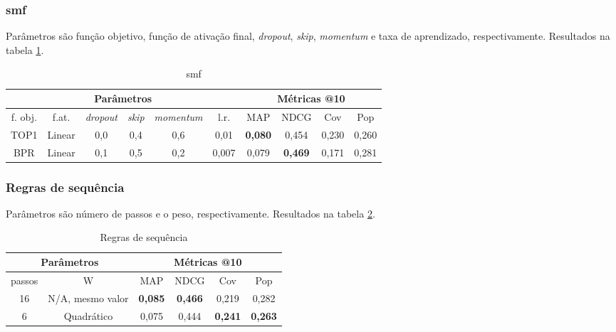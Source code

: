 \subsubsection{smf}
Parâmetros são função objetivo, função de ativação final, \textit{dropout},
\textit{skip}, \textit{momentum} e taxa de aprendizado, respectivamente.
Resultados na tabela \ref{opt:smf_rem}.

\begin{table}[htbp]
  \centering
  \begin{tabular}{|c|c|c|c|c|c|c|c|c|c|}
    \hline
      \multicolumn{6}{|c|}{Parâmetros} & \multicolumn{4}{c|}{Métricas @10} \\
      \hline
      f. obj. & f.at. & \textit{dropout} & \textit{skip} & \textit{momentum} & l.r. & MAP & NDCG & Cov & Pop \\
      \hline
      TOP1 & Linear & 0,0 & 0,4 & 0,6 & 0,01 & \textbf{0,080} & 0,454 & 0,230 & 0,260 \\
      \hline
      BPR & Linear & 0,1 & 0,5 & 0,2 & 0,007 & 0,079 & \textbf{0,469} & 0,171 & 0,281 \\
      \hline
      \end{tabular}
      \caption{smf}
      \label{opt:smf_rem}
\end{table}

\subsubsection{Regras de sequência}
Parâmetros são número de passos e o peso, respectivamente. Resultados na tabela
\ref{opt:sr_rem}.

\begin{table}[htbp]
  \centering
  \begin{tabular}{|c|c|c|c|c|c|}
    \hline
      \multicolumn{2}{|c|}{Parâmetros} & \multicolumn{4}{c|}{Métricas @10} \\
      \hline
      passos & W & MAP & NDCG & Cov & Pop \\
      \hline
      16 & N/A, mesmo valor & \textbf{0,085} & \textbf{0,466} & 0,219 & 0,282 \\
      \hline
      6 & Quadrático & 0,075 & 0,444 & \textbf{0,241} & \textbf{0,263} \\
      \hline
\end{tabular}
      \caption{Regras de sequência}
      \label{opt:sr_rem}
\end{table}

